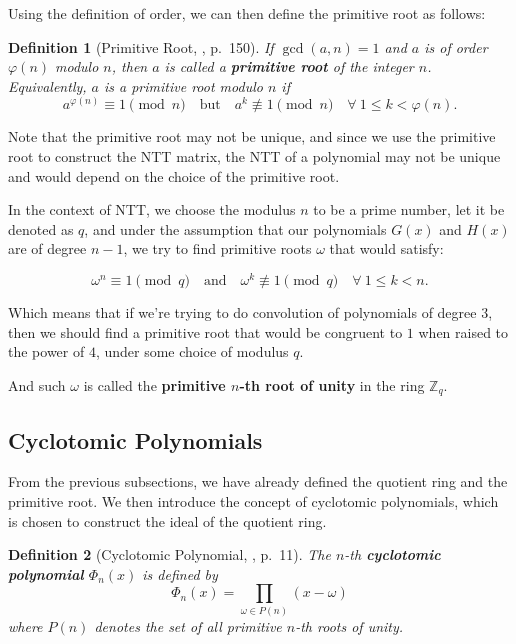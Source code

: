 \documentclass[12pt]{article}
\newtheorem{definition}{Definition}[section]
\begin{document}
Using the definition of order, we can then define the primitive root as follows:

\begin{definition}[Primitive Root, \cite{number_theory}, p.~150]
    If $\gcd(a, n) = 1$ and $a$ is of order $\varphi(n)$ modulo $n$, 
    then $a$ is called a \textbf{primitive root} of the integer $n$.
    Equivalently, $a$ is a primitive root modulo $n$ if
    \begin{equation*}
    a^{\varphi(n)} \equiv 1 \pmod{n} \quad \text{but} \quad a^k \not\equiv 1 \pmod{n} \quad \forall \ 1 \leq k < \varphi(n).
    \end{equation*}
\end{definition}

Note that the primitive root may not be unique, and since we use the primitive root to construct the NTT matrix, 
the NTT of a polynomial may not be unique and would depend on the choice of the primitive root.
\cite[pp.~5--6]{beginner_guide}
\bigskip

In the context of NTT, we choose the modulus $n$ to be a prime number, let it be denoted as $q$, 
and under the assumption that our polynomials $G(x)$ and $H(x)$ are of degree $n-1$, 
we try to find primitive roots $\omega$ that would satisfy:

\begin{equation*}
    \omega^n \equiv 1 \pmod{q} \quad \text{and} \quad \omega^k \not\equiv 1 \pmod{q} \quad \forall \ 1 \leq k < n.
\end{equation*}

Which means that if we're trying to do convolution of polynomials of degree $3$, 
then we should find a primitive root that would be congruent to $1$ when raised to the power of $4$, 
under some choice of modulus $q$.

And such $\omega$ is called the \textbf{primitive $n$-th root of unity} in the ring $\mathbb{Z}_q$.
\cite[p.~4]{beginner_guide}

\subsection{Cyclotomic Polynomials}

From the previous subsections, we have already defined the quotient ring and the primitive root.
We then introduce the concept of cyclotomic polynomials, 
which is chosen to construct the ideal of the quotient ring.
\cite[p.~3]{survey}

\begin{definition}[Cyclotomic Polynomial, \cite{cyclotomic}, p.~11]
    The $n$-th \textbf{cyclotomic polynomial} $\Phi_n(x)$ is defined by
    \begin{equation*}
        \Phi_n(x) = \prod_{\omega \in P(n)} (x - \omega)
    \end{equation*}
    where $P(n)$ denotes the set of all primitive $n$-th roots of unity.
\end{definition}
\end{document}
